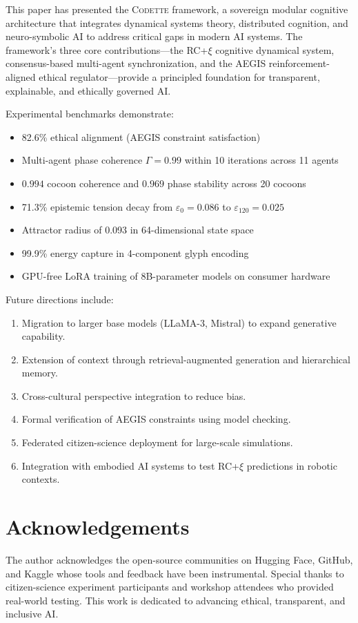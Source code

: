 \documentclass[11pt,a4paper]{article}
\newcommand{\rcxi}{RC+$\xi$}
\newcommand{\codette}{\textsc{Codette}}
\begin{document}
This paper has presented the \codette{} framework, a sovereign modular cognitive architecture that integrates dynamical systems theory, distributed cognition, and neuro-symbolic AI to address critical gaps in modern AI systems. The framework's three core contributions---the \rcxi{} cognitive dynamical system, consensus-based multi-agent synchronization, and the AEGIS reinforcement-aligned ethical regulator---provide a principled foundation for transparent, explainable, and ethically governed AI.

Experimental benchmarks demonstrate:
\begin{itemize}[leftmargin=*]
  \item 82.6\% ethical alignment (AEGIS constraint satisfaction)
  \item Multi-agent phase coherence $\Gamma = 0.99$ within 10 iterations across 11 agents
  \item $0.994$ cocoon coherence and $0.969$ phase stability across 20 cocoons
  \item 71.3\% epistemic tension decay from $\varepsilon_0 = 0.086$ to $\varepsilon_{120} = 0.025$
  \item Attractor radius of 0.093 in 64-dimensional state space
  \item 99.9\% energy capture in 4-component glyph encoding
  \item GPU-free LoRA training of 8B-parameter models on consumer hardware
\end{itemize}

Future directions include:
\begin{enumerate}[leftmargin=*]
  \item Migration to larger base models (LLaMA-3, Mistral) to expand generative capability.
  \item Extension of context through retrieval-augmented generation and hierarchical memory.
  \item Cross-cultural perspective integration to reduce bias.
  \item Formal verification of AEGIS constraints using model checking.
  \item Federated citizen-science deployment for large-scale simulations.
  \item Integration with embodied AI systems to test \rcxi{} predictions in robotic contexts.
\end{enumerate}

\section*{Acknowledgements}
The author acknowledges the open-source communities on Hugging Face, GitHub, and Kaggle whose tools and feedback have been instrumental. Special thanks to citizen-science experiment participants and workshop attendees who provided real-world testing. This work is dedicated to advancing ethical, transparent, and inclusive AI.
\end{document}
